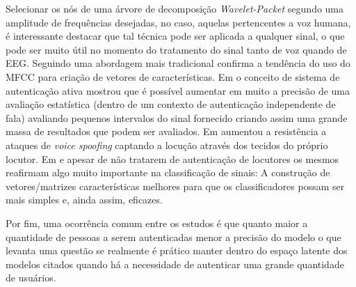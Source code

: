 Selecionar os nós de uma árvore de decomposição \textit{Wavelet-Packet} segundo uma amplitude de frequências desejadas, no caso, aquelas pertencentes a voz humana, é interessante destacar que tal técnica pode ser aplicada a qualquer sinal, o que pode ser muito útil no momento do tratamento do sinal tanto de voz quando de EEG. Seguindo uma abordagem mais tradicional \cite{ali2022speech} confirma a tendência do uso do MFCC para criação de vetores de características. Em \cite{WOS:000525844000004} o conceito de sistema de autenticação ativa mostrou que é possível aumentar em muito a precisão de uma avaliação estatística (dentro de um contexto de autenticação independente de fala) avaliando pequenos intervalos do sinal fornecido criando assim uma grande massa de resultados que podem ser avaliados. Em \cite{10.1145/3448113} aumentou a resistência a ataques de \textit{voice spoofing} captando a locução através dos tecidos do próprio locutor. Em \cite{furlan2021caracterizacao} e \cite{9744556} apesar de não tratarem de autenticação de locutores os mesmos reafirmam algo muito importante na classificação de sinais: A construção de vetores/matrizes características melhores para que os classificadores possam ser mais simples e, ainda assim, eficazes.
			

			\par Por fim, uma ocorrência comum entre os estudos é que quanto maior a quantidade de pessoas a serem autenticadas menor a precisão do modelo o que levanta uma questão se realmente é prático manter dentro do espaço latente dos modelos citados quando há a necessidade de autenticar uma grande quantidade de usuários.
			